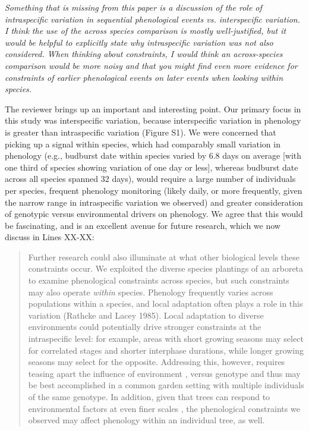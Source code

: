 \documentclass[10.95pt,a4paper]{letter}
\begin{document}
\par \emph{Something that is missing from this paper is a discussion of the role of intraspecific variation in sequential phenological events vs. interspecific variation.  I think the use of the across species comparison is mostly well-justified, but it would be helpful to explicitly state why intraspecific variation was not also considered.  When thinking about constraints, I would think an across-species comparison would be more noisy and that you might find even more evidence for constraints of earlier phenological events on later events when looking within species.}
\par The reviewer brings up an important and interesting point. Our primary focus in this study was interspecific variation, because interspecific variation in phenology is greater than intraspecific variation (Figure S1). We were concerned that picking up a signal within species, which had comparably small variation in phenology (e.g., budburst date within species varied by 6.8 days on average [with one third of species showing variation of one day or less], whereas budburst date across all species spanned 32 days), would require a large number of individuals per species, frequent phenology monitoring (likely daily, or more frequently, given the narrow range in intraspecific variation we observed) and greater consideration of genotypic versus environmental drivers on phenology. We agree that this would be fascinating, and is an excellent avenue for future research, which we now discuss in Lines XX-XX:

\begin{quote}
Further research could also illuminate at what other biological levels these constraints occur. We exploited the diverse species plantings of an arboreta to examine phenological constraints across species, but such constraints may also operate \emph{within} species. Phenology frequently varies across populations within a species, and local adaptation often plays a role in this variation (Rathcke and Lacey 1985). Local adaptation to diverse environments could potentially drive stronger constraints at the intraspecific level: for example, areas with short growing seasons may select for correlated stages and shorter interphase durations, while longer growing seasons may select for the opposite. Addressing this, however, requires teasing apart the influence of environment \citep[even to the microclimatic level][]{SCHWARTZ.IJBiomet.2013}, versus genotype and thus may be best accomplished in a common garden setting with multiple individuals of the same genotype. In addition, given that trees can respond  to environmental factors at even finer scales \citep[e.g., the branch level,][]{nakamura2010}, the phenological constraints we observed may affect phenology within an individual tree, as well. 
\end{quote}
\end{document}
